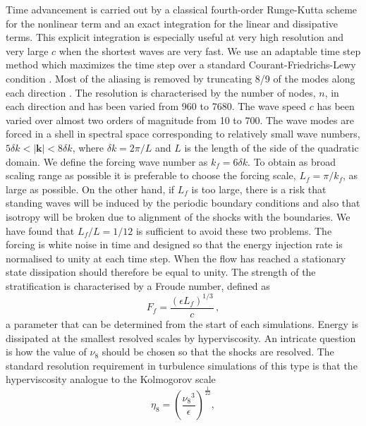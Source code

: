 \documentclass{jfm}
\newcommand{\kk}{\textbf{k}}
\begin{document}
%
Time advancement is carried out by a classical fourth-order Runge-Kutta scheme
for the nonlinear term and an exact integration for the linear and dissipative
terms. This explicit integration is especially useful at very high resolution
and very large $c$ when the shortest waves are very fast. We use an adaptable
time step method which maximizes the time step over a standard
Courant-Friedrichs-Lewy condition \cite[]{Lundbladh1999,
AugierChomazBillant2012}.
%
Most of the aliasing is removed by truncating 8/9 of the modes along each
direction \cite[for a detail discussion on the issues of the non-conservation
of the non-quadratic energy and the aliasing errors in the truncated one-layer
shallow water model, see][]{FargeSadourny1989}. The resolution is characterised
by the number of nodes, $n$, in each direction and has been varied from 960
to 7680.
%
The wave speed $c$ has been varied over almost two orders of magnitude from 10
to 700. The wave modes are forced in a shell in spectral space corresponding to
relatively small wave numbers, $ 5 \delta k < |\kk| < 8 \delta k$, where $
\delta k = 2 \pi /L $ and $ L $ is the length of the side of the quadratic
domain.  We define the forcing wave number as $ k_f = 6 \delta k $. To obtain as broad scaling range as possible it is preferable to choose 
the forcing scale, $ L_f = \pi/k_f $, as large as possible. On the other hand, if $ L_f $ is too large, there is a risk that standing waves will be induced by the periodic boundary conditions and also that isotropy will be broken due to alignment of the shocks with the boundaries. 
We have found that $ L_f/L =1/12 $ is sufficient to avoid these two problems. 
The forcing is white noise in time and designed so that the energy
injection rate is normalised to unity at each time step. When the flow has reached a stationary state dissipation should therefore be equal to unity. 
The strength of the stratification is characterised by a
Froude number, defined as
\begin{equation} \label{Fr}
F_f = \frac{(\epsilon L_f)^{1/3}}{c} \, ,
\end{equation}
a parameter that can be determined from the start of each simulations.
Energy is dissipated at the smallest resolved scales by hyperviscosity. An intricate question is how the value of $ \nu_{8} $ should be chosen so that the shocks are resolved. The standard resolution requirement in turbulence simulations of this type is that the hyperviscosity analogue to the Kolmogorov scale
\begin{equation}  \label{KolmEight}
\eta_{8} = \left( \frac{{\nu_8}^3}{\epsilon} \right)^{\frac{1}{22}},
\end{equation}
\end{document}
